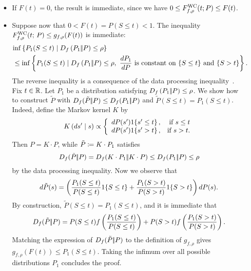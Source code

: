 \begin{itemize}
\item If $F(t) = 0$, the result is immediate, since we have $0 \le F^{\textup{WC}}_{f,\rho}(t; P) \le F(t)$.
\item Suppose now that $0 < F(t)
= P( S \le t) < 1$.
The inequality $F^{\textup{WC}}_{f,\rho}(t; \, P) \le g_{f,\rho}(F(t))$ is
immediate:
\begin{align*}
  \lefteqn{
    \inf\left\{P_1(S \le t) \mid \fdiv{P_1}{P} \le \rho \right\}
  } \\
  & \le
  \inf\left\{P_1(S \le t) \mid \fdiv{P_1}{P} \le \rho,
  ~ \frac{dP_1}{dP} ~ \mbox{is~constant~on~}
  \{S \le t\} ~ \mbox{and} ~ \{S > t\} \right\}.
\end{align*}
The reverse inequality is a consequence of the data processing
inequality~\cite{LieseVa06}. Fix $t \in \mathbb{R}$. Let $P_1$
be a distribution satisfying $D_{f}\left({P_1} |\!| {P}\right) \le \rho$. We show how
to construct $\tilde{P}$ with $D_{f}({\tilde{P}} |\!| {P})
\le D_{f}({P_1} |\!| {P})$ and $\tilde{P}(S \le t) = P_1(S \le t)$.
Indeed, define the Markov kernel $K$ by
\begin{align*}
  K \left(ds^\prime \mid s \right) \propto              
  \left\{
  \begin{array}{lr}
    dP(s^\prime) 1\!\left\{s^\prime \le t\right\}, &\text{if } s \le t\\
    dP(s^\prime) 1\!\left\{s^\prime > t\right\},   &\text{if } s > t. \\
  \end{array}\right.
\end{align*}
Then $P = K \cdot P$, while $\tilde{P} \coloneqq K \cdot P_1$
satisfies
\begin{align*}
  D_{f}({\tilde{P}} |\!| {P})
  = D_{f}({K \cdot P_1} |\!| {K \cdot P})
  \le D_{f}({P_1} |\!| {P}) \le \rho
\end{align*}
by the data processing inequality. Now we observe that
\begin{align*}
  d\tilde{P}(s) = \left(
  \frac{P_1(S \le t)}{P(S \le t)}1\!\left\{S \le t\right\}
  +  \frac{P_1(S > t)}{P(S > t)}1\!\left\{S > t\right\} 
  \right) dP(s).
\end{align*}
By construction, $\tilde{P}(S \le t) = P_1(S \le t)$,
and it is immediate that
\begin{align*}
  D_{f}({\tilde{P}} |\!| {P})
  = P(S\le t)f\left(\frac{P_1(S \le t)}{P(S \le t)}\right)
  + P(S> t)f\left(\frac{P_1(S > t)}{P(S > t)}\right).
\end{align*}
Matching the expression of $D_{f}({\tilde{P}} |\!| {P})$ to the definition of
$g_{f,\rho}$ gives $g_{f,\rho}(F(t)) \le P_1(S \le t)$.  Taking the infimum
over all possible distributions $P_1$ concludes the proof.


\end{itemize}
